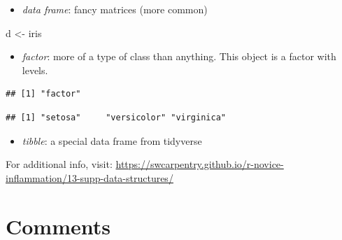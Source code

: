 \documentclass[
]{book}
\newenvironment{Shaded}{\begin{snugshade}}{\end{snugshade}}
\newcommand{\FunctionTok}[1]{\textcolor[rgb]{0.00,0.00,0.00}{#1}}
\newcommand{\NormalTok}[1]{#1}
\newcommand{\OtherTok}[1]{\textcolor[rgb]{0.56,0.35,0.01}{#1}}
\newcommand{\SpecialCharTok}[1]{\textcolor[rgb]{0.00,0.00,0.00}{#1}}
\providecommand{\tightlist}{%
  \setlength{\itemsep}{0pt}\setlength{\parskip}{0pt}}
\begin{document}
\begin{itemize}
\tightlist
\item
  \emph{data frame}: fancy matrices (more common)
\end{itemize}

\begin{Shaded}
\begin{Highlighting}[]
\NormalTok{d }\OtherTok{\textless{}{-}}\NormalTok{ iris}
\end{Highlighting}
\end{Shaded}

\begin{itemize}
\tightlist
\item
  \emph{factor}: more of a type of class than anything. This object is a factor with levels.
\end{itemize}

\begin{Shaded}
\end{Shaded}

\begin{verbatim}
## [1] "factor"
\end{verbatim}

\begin{Shaded}
\end{Shaded}

\begin{verbatim}
## [1] "setosa"     "versicolor" "virginica"
\end{verbatim}

\begin{itemize}
\tightlist
\item
  \emph{tibble}: a special data frame from tidyverse
\end{itemize}

For additional info, visit: \url{https://swcarpentry.github.io/r-novice-inflammation/13-supp-data-structures/}

\hypertarget{comments}{%
\section{Comments}\label{comments}}
\end{document}
